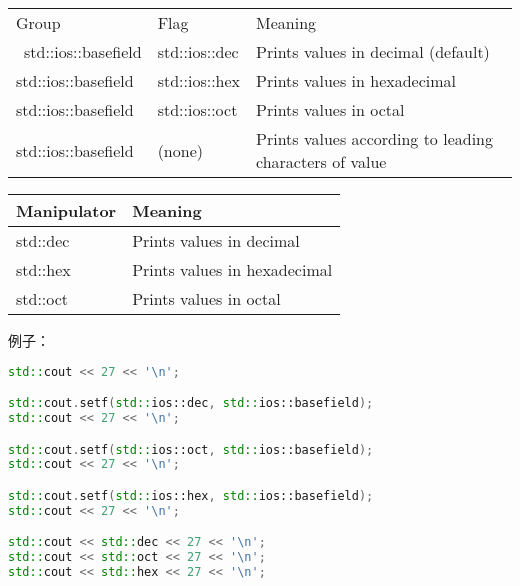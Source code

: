 \documentclass[../../LearnCpp.tex]{subfiles}
\begin{document}
\begin{center}
  \begin{tiny}
    \begin{tabularx}{ 1\textwidth}{
        | >{\raggedright\arraybackslash}X
        | >{\raggedright\arraybackslash}X
        | >{\raggedright\arraybackslash}X |
      }
      \hline
      Group               & Flag          & Meaning                                                \\
      \
      std::ios::basefield & std::ios::dec & Prints values in decimal (default)                     \\
      std::ios::basefield & std::ios::hex & Prints values in hexadecimal                           \\
      std::ios::basefield & std::ios::oct & Prints values in octal                                 \\
      std::ios::basefield & (none)        & Prints values according to leading characters of value \\
      \hline
    \end{tabularx}
  \end{tiny}
\end{center}

\begin{center}
  \begin{tiny}
    \begin{tabularx}{ 1\textwidth}{
        | >{\raggedright\arraybackslash}X
        | >{\raggedright\arraybackslash}X |
      }
      \hline
      Manipulator & Meaning                      \\
      \hline
      std::dec    & Prints values in decimal     \\
      std::hex    & Prints values in hexadecimal \\
      std::oct    & Prints values in octal       \\
      \hline
    \end{tabularx}
  \end{tiny}
\end{center}

例子：

\begin{lstlisting}[language=C++]
std::cout << 27 << '\n';

std::cout.setf(std::ios::dec, std::ios::basefield);
std::cout << 27 << '\n';

std::cout.setf(std::ios::oct, std::ios::basefield);
std::cout << 27 << '\n';

std::cout.setf(std::ios::hex, std::ios::basefield);
std::cout << 27 << '\n';

std::cout << std::dec << 27 << '\n';
std::cout << std::oct << 27 << '\n';
std::cout << std::hex << 27 << '\n';
\end{lstlisting}
\end{document}
